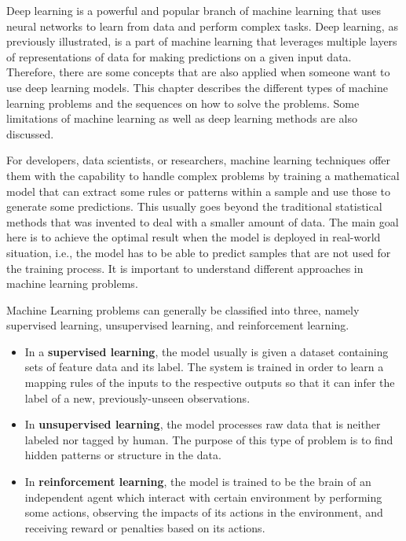 \documentclass[
  letterpaper,
  DIV=11,
  numbers=noendperiod]{scrreprt}
\providecommand{\tightlist}{%
  \setlength{\itemsep}{0pt}\setlength{\parskip}{0pt}}\usepackage{longtable,booktabs,array}
\begin{document}
Deep learning is a powerful and popular branch of machine learning that
uses neural networks to learn from data and perform complex tasks. Deep
learning, as previously illustrated, is a part of machine learning that
leverages multiple layers of representations of data for making
predictions on a given input data. Therefore, there are some concepts
that are also applied when someone want to use deep learning models.
This chapter describes the different types of machine learning problems
and the sequences on how to solve the problems. Some limitations of
machine learning as well as deep learning methods are also discussed.

For developers, data scientists, or researchers, machine learning
techniques offer them with the capability to handle complex problems by
training a mathematical model that can extract some rules or patterns
within a sample and use those to generate some predictions. This usually
goes beyond the traditional statistical methods that was invented to
deal with a smaller amount of data. The main goal here is to achieve the
optimal result when the model is deployed in real-world situation, i.e.,
the model has to be able to predict samples that are not used for the
training process. It is important to understand different approaches in
machine learning problems.

Machine Learning problems can generally be classified into three, namely
supervised learning, unsupervised learning, and reinforcement learning.

\begin{itemize}
\tightlist
\item
  In a \textbf{supervised learning}, the model usually is given a
  dataset containing sets of feature data and its label. The system is
  trained in order to learn a mapping rules of the inputs to the
  respective outputs so that it can infer the label of a new,
  previously-unseen observations.
\item
  In \textbf{unsupervised learning}, the model processes raw data that
  is neither labeled nor tagged by human. The purpose of this type of
  problem is to find hidden patterns or structure in the data.
\item
  In \textbf{reinforcement learning}, the model is trained to be the
  brain of an independent agent which interact with certain environment
  by performing some actions, observing the impacts of its actions in
  the environment, and receiving reward or penalties based on its
  actions.
\end{itemize}
\end{document}
